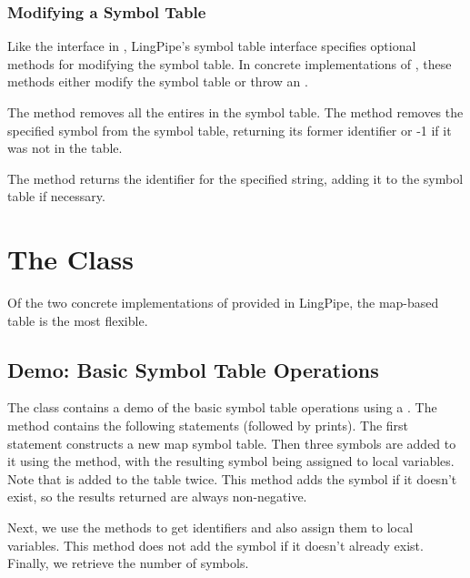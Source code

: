 \subsubsection{Modifying a Symbol Table}

Like the  interface in , LingPipe's
symbol table interface specifies optional methods for modifying the
symbol table.  In concrete implementations of ,
these methods either modify the symbol table or throw an
.

The method  removes all the entires in the symbol table.
The method  removes the specified symbol
from the symbol table, returning its former identifier or -1 if it
was not in the table.  

The method  returns the identifier
for the specified string, adding it to the symbol table if necessary.



\section{The  Class}

Of the two concrete implementations of  provided in
LingPipe, the map-based table is the most flexible.  

\subsection{Demo: Basic Symbol Table Operations}

The class  contains a demo of the basic symbol
table operations using a .  The 
method contains the following statements (followed by prints).
%
%
The first statement constructs a new map symbol table.  Then three
symbols are added to it using the  method, with
the resulting symbol being assigned to local variables.  Note that
 is added to the table twice.  This method adds the
symbol if it doesn't exist, so the results returned are always
non-negative.

Next, we use the  methods to get identifiers
and also assign them to local variables.  This method does not
add the symbol if it doesn't already exist.  Finally, we retrieve
the number of symbols.

